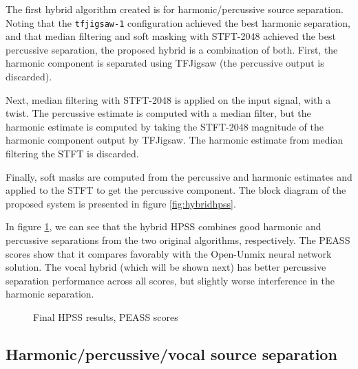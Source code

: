 \documentclass[letter,12pt]{article}
\begin{document}
The first hybrid algorithm created is for harmonic/percussive source separation. Noting that the \Verb#tfjigsaw-1# configuration achieved the best harmonic separation, and that median filtering and soft masking with STFT-2048 achieved the best percussive separation, the proposed hybrid is a combination of both. First, the harmonic component is separated using TFJigsaw (the percussive output is discarded).

Next, median filtering with STFT-2048 is applied on the input signal, with a twist. The percussive estimate is computed with a median filter, but the harmonic estimate is computed by taking the STFT-2048 magnitude of the harmonic component output by TFJigsaw. The harmonic estimate from median filtering the STFT is discarded.

Finally, soft masks are computed from the percussive and harmonic estimates and applied to the STFT to get the percussive component. The block diagram of the proposed system is presented in figure \ref{fig:hybridhpss}.

In figure \ref{fig:finalhpss}, we can see that the hybrid HPSS combines good harmonic and percussive separations from the two original algorithms, respectively. The PEASS scores show that it compares favorably with the Open-Unmix neural network solution. The vocal hybrid (which will be shown next) has better percussive separation performance across all scores, but slightly worse interference in the harmonic separation.

\begin{figure}[ht]
	\centering
	\caption{Final HPSS results, PEASS scores}
	\label{fig:finalhpss}
\end{figure}

\subsection{Harmonic/percussive/vocal source separation}
\end{document}
